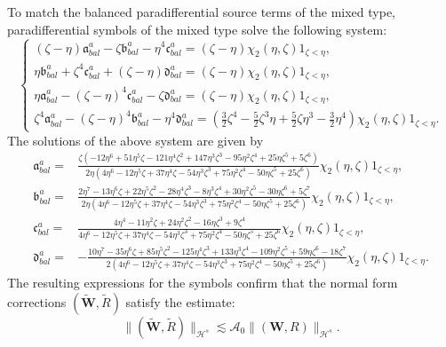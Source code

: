 \documentclass[10pt]{amsart}
\theoremstyle{remark}
\theoremstyle{definition}
\numberwithin{equation}{section}
\renewcommand{\H}{{\mathcal H }}
\newcommand{\f}{\frac}
\newcommand{\bw}{\mathbf{W}}
\begin{document}
To match the balanced paradifferential source terms of the mixed type, paradifferential symbols of the mixed type solve the following  system:
\begin{equation*}
\begin{cases}
(\zeta-\eta)\mathfrak{a}^{a}_{bal}-\zeta\mathfrak{b}^{a}_{bal}-\eta^4\mathfrak{c}^{a}_{bal}=(\zeta-\eta)\chi_{2}(\eta,\zeta)1_{\zeta<\eta},\\
\eta\mathfrak{b}^{a}_{bal}+\zeta^4\mathfrak{c}^{a}_{bal}+(\zeta-\eta)\mathfrak{d}^{a}_{bal}=(\zeta-\eta)\chi_{2}(\eta,\zeta)1_{\zeta<\eta},\\
\eta\mathfrak{a}^{a}_{bal}-(\zeta-\eta)^4\mathfrak{c}^{a}_{bal}-\zeta\mathfrak{d}^{a}_{bal}=(\zeta-\eta)\chi_{2}(\eta,\zeta)1_{\zeta<\eta},\\
\zeta^4 \mathfrak{a}^{a}_{bal}-(\zeta-\eta)^4\mathfrak{b}^{a}_{bal}-\eta^4\mathfrak{d}^{a}_{bal}=\left(\f32\zeta^4 -\f52\zeta^3\eta +\f52\zeta \eta^3-\f32\eta^4\right)\chi_{2}(\eta,\zeta)1_{\zeta<\eta}.
\end{cases}
\end{equation*}
The solutions of the above system are given by
\begin{align*}
\mathfrak{a}^a_{bal}=&\f{\zeta(-12\eta^6+51\eta^5\zeta-121\eta^4\zeta^2+147\eta^3\zeta^3-95\eta^2\zeta^4+25\eta\zeta^5+5\zeta^6)}{2\eta(4\eta^6-12\eta^5\zeta+37\eta^4\zeta-54\eta^3\zeta^3+75\eta^2\zeta^4-50\eta\zeta^5+25\zeta^6)}\chi_{2}(\eta, \zeta)1_{\zeta<\eta},\\
\mathfrak{b}^a_{bal}=&\f{2\eta^7-13\eta^6\zeta+22\eta^5\zeta^2-28\eta^4\zeta^3-8\eta^3\zeta^4+30\eta^2\zeta^5-30\eta\zeta^6+5\zeta^7}{2\eta(4\eta^6-12\eta^5\zeta+37\eta^4\zeta-54\eta^3\zeta^3+75\eta^2\zeta^4-50\eta\zeta^5+25\zeta^6)}\chi_{2}(\eta, \zeta)1_{\zeta<\eta},\\
\mathfrak{c}^a_{bal}=&\f{4\eta^4-11\eta^2\zeta+24\eta^2\zeta^2-16\eta\zeta^3+9\zeta^4}{4\eta^6-12\eta^5\zeta+37\eta^4\zeta-54\eta^3\zeta^3+75\eta^2\zeta^4-50\eta\zeta^5+25\zeta^6}\chi_{2}(\eta, \zeta)1_{\zeta<\eta},\\
\mathfrak{d}^a_{bal}=&-\f{10\eta^7-35\eta^6\zeta+85\eta^5\zeta^2-125\eta^4\zeta^3+133\eta^3\zeta^4-109\eta^2\zeta^5+59\eta\zeta^6-18\zeta^7}{2(4\eta^6-12\eta^5\zeta+37\eta^4\zeta-54\eta^3\zeta^3+75\eta^2\zeta^4-50\eta\zeta^5+25\zeta^6)}\chi_{2}(\eta, \zeta)1_{\zeta<\eta}.
\end{align*}
The resulting expressions for the symbols confirm that the normal form corrections $(\tilde{\bw}, \tilde{R})$ satisfy the estimate:
\begin{equation*}
    \|(\tilde{\bw}, \tilde{R})\|_{\H^s} \lesssim \mathcal{A}_{0}\|(\bw,R)\|_{\H^s}.
\end{equation*}
\end{document}
